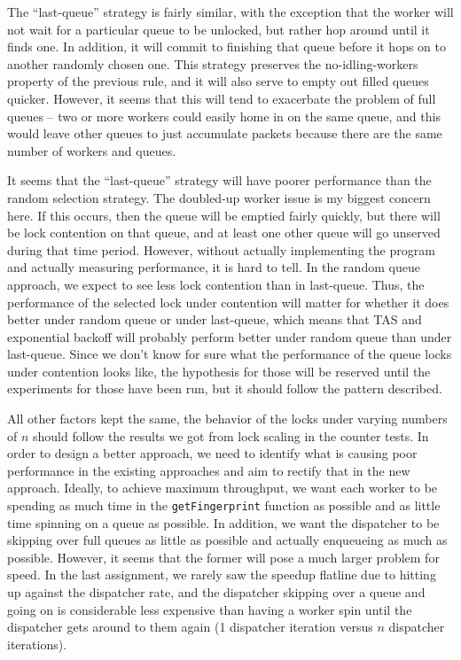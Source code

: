 \documentclass{article}
\begin{document}
The ``last-queue'' strategy is fairly similar, with the exception that the worker will not wait for a particular queue to be unlocked, but rather hop around until it finds one. In addition, it will commit to finishing that queue before it hops on to another randomly chosen one. This strategy preserves the no-idling-workers property of the previous rule, and it will also serve to empty out filled queues quicker. However, it seems that this will tend to exacerbate the problem of full queues -- two or more workers could easily home in on the same queue, and this would leave other queues to just accumulate packets because there are the same number of workers and queues.

It seems that the ``last-queue'' strategy will have poorer performance than the random selection strategy. The doubled-up worker issue is my biggest concern here. If this occurs, then the queue will be emptied fairly quickly, but there will be lock contention on that queue, and at least one other queue will go unserved during that time period. However, without actually implementing the program and actually measuring performance, it is hard to tell.
In the random queue approach, we expect to see less lock contention than in last-queue. Thus, the performance of the selected lock under contention will matter for whether it does better under random queue or under last-queue, which means that TAS and exponential backoff will probably perform better under random queue than under last-queue. Since we don't know for sure what the performance of the queue locks under contention looks like, the hypothesis for those will be reserved until the experiments for those have been run, but it should follow the pattern described.

All other factors kept the same, the behavior of the locks under varying numbers of $n$ should follow the results we got from lock scaling in the counter tests. 
In order to design a better approach, we need to identify what is causing poor performance in the existing approaches and aim to rectify that in the new approach. Ideally, to achieve maximum throughput, we want each worker to be spending as much time in the \verb|getFingerprint| function as possible and as little time spinning on a queue as possible. In addition, we want the dispatcher to be skipping over full queues as little as possible and actually enqueueing as much as possible. However, it seems that the former will pose a much larger problem for speed. In the last assignment, we rarely saw the speedup flatline due to hitting up against the dispatcher rate, and the dispatcher skipping over a queue and going on is considerable less expensive than having a worker spin until the dispatcher gets around to them again (1 dispatcher iteration versus $n$ dispatcher iterations).
\end{document}
